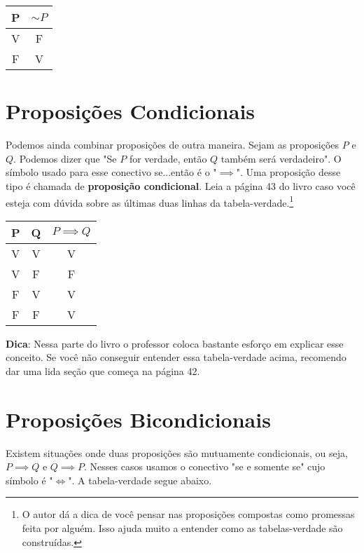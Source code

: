 \documentclass[a4paper,11pt,oneside]{book}
\theoremstyle{definition}
\theoremstyle{break}
\begin{document}
\begin{center}
\begin{tabular}{ | c || c | }
\hline
 P & $\sim P$ \\ 
 \hline
 V & F \\  
 F & V \\
 \hline
\end{tabular}
\end{center}

\section{Proposições Condicionais}

Podemos ainda combinar proposições de outra maneira. Sejam as proposições $P$ e $Q$. Podemos dizer que "Se $P$ for verdade, então $Q$ também será verdadeiro". O símbolo usado para esse conectivo se...então é o "$\implies$". Uma proposição desse tipo é chamada de \textbf{proposição condicional}. Leia a página 43 do livro caso você esteja com dúvida sobre as últimas duas linhas da tabela-verdade.\footnote{O autor dá a dica de você pensar nas proposições compostas como promessas feita por alguém. Isso ajuda muito a entender como as tabelas-verdade são construídas.}

\begin{center}
\begin{tabular}{ | c c || c | }
\hline
 P & Q & $P \implies Q$ \\ 
 \hline
 V & V & V \\  
 V & F & F \\  
 F & V & V \\  
 F & F & V \\
 \hline
\end{tabular}
\end{center}

\textbf{Dica}: Nessa parte do livro o professor coloca bastante esforço em explicar esse conceito. Se você não conseguir entender essa tabela-verdade acima, recomendo dar uma lida seção que começa na página 42.

\section{Proposições Bicondicionais}

Existem situações onde duas proposições são mutuamente condicionais, ou seja, $P \implies Q$ e $Q \implies P$. Nesses casos usamos o conectivo "se e somente se" cujo símbolo é "$\iff$".  A tabela-verdade segue abaixo.
\end{document}
